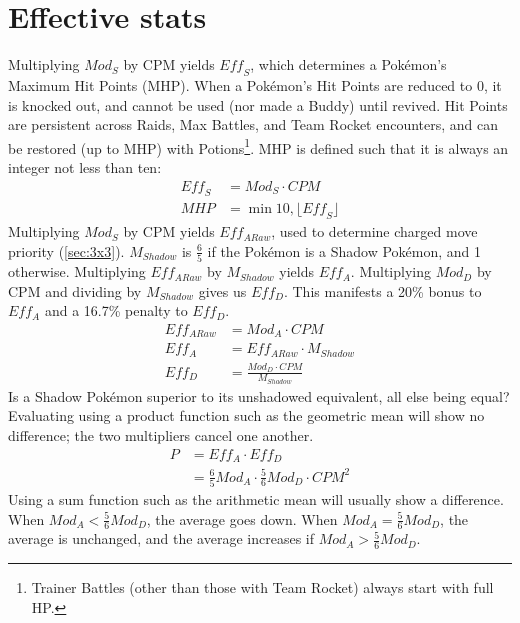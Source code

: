 \section{Effective stats\label{sec:effectivestats}}
Multiplying $\mathit{Mod_S}$ by CPM yields $\mathit{Eff_S}$, which determines a Pokémon's Maximum Hit Points (MHP).
When a Pokémon's Hit Points are reduced to 0, it is knocked out, and cannot be
 used (nor made a Buddy) until revived.
Hit Points are persistent across Raids, Max Battles, and Team Rocket encounters,
 and can be restored (up to MHP) with Potions\footnote{Trainer Battles (other
 than those with Team Rocket) always start with full HP.}.
MHP is defined such that it is always an integer not less than ten:
\begin{align*}
 \mathit{Eff_S} &= \mathit{Mod_S} \cdot CPM \\
 MHP &= \min{10, \lfloor \mathit{Eff_S} \rfloor}
\end{align*}
Multiplying $Mod_S$ by CPM yields $Eff_{ARaw}$, used to determine charged move priority (\autoref{sec:3x3}).
$M_{Shadow}$ is $\frac{6}{5}$ if the Pokémon is a Shadow Pokémon, and 1 otherwise.
Multiplying $Eff_{ARaw}$ by $M_{Shadow}$ yields $Eff_A$.
Multiplying $Mod_D$ by CPM and dividing by $M_{Shadow}$ gives us $Eff_D$.
This manifests a 20\% bonus to $Eff_A$ and a 16.7\% penalty to $Eff_D$.
\begin{align*}
  Eff_{ARaw} &= Mod_A \cdot CPM\\
  Eff_A &= Eff_{ARaw} \cdot M_{Shadow} \\
 Eff_D &= \frac{Mod_D \cdot CPM}{M_{Shadow}}
\end{align*}
Is a Shadow Pokémon superior to its unshadowed equivalent, all else being equal?
Evaluating using a product function such as the geometric mean will show no difference;
 the two multipliers cancel one another.
\begin{align*}
  P &= Eff_A \cdot Eff_D\\
  &= \frac{6}{5}Mod_A \cdot \frac{5}{6}Mod_D \cdot CPM^2
\end{align*}
Using a sum function such as the arithmetic mean will usually show a difference.
When $Mod_A < \frac{5}{6}Mod_D$, the average goes down.
When $Mod_A = \frac{5}{6}Mod_D$, the average is unchanged,
 and the average increases if $Mod_A > \frac{5}{6}Mod_D$.

